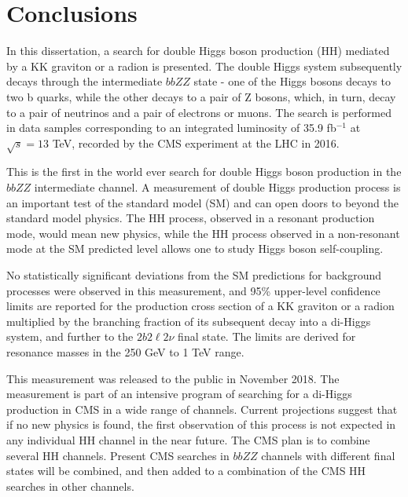 \chapter{Conclusions}
\label{ch:Conclusions}

In this dissertation, a search for double Higgs boson production (HH) mediated by a KK graviton or a radion is presented. The double Higgs system subsequently decays through the intermediate $bbZZ$ state - one of the Higgs bosons decays to two b quarks, while the other decays to a pair of Z bosons, which, in turn, decay to a pair of neutrinos and a pair of electrons or muons. The search is performed in data samples corresponding to an integrated luminosity of 35.9 fb$^{-1}$ at $\sqrt s =13$ TeV, recorded by the CMS experiment at the LHC in 2016. 

This is the first in the world ever search for double Higgs boson production in the $bbZZ$ intermediate channel. A measurement of double Higgs production process is an important test of the standard model (SM) and can open doors to beyond the standard model physics. The HH process, observed in a resonant production mode, would mean new physics, while the HH process observed in a non-resonant mode at the SM predicted level allows one to study Higgs boson self-coupling. 

No statistically significant deviations from the SM predictions for background processes were observed in this measurement, and 95\% upper-level confidence limits are reported for the production cross section of a KK graviton or a radion multiplied by the branching fraction of its subsequent decay into a di-Higgs system, and further to the $2 b 2 \ell 2 \nu$ final state. The limits are derived for resonance masses in the 250 GeV to 1 TeV range.

This measurement was released to the public in November 2018. The measurement is part of an intensive program of searching for a di-Higgs production in CMS in a wide range of channels. Current projections suggest that if no new physics is found, the first observation of this process is not expected in any individual HH channel in the near future. The CMS plan is to combine several HH channels. Present CMS searches in $bbZZ$ channels with different final states will be combined, and then added to a combination of the CMS HH searches in other channels.
